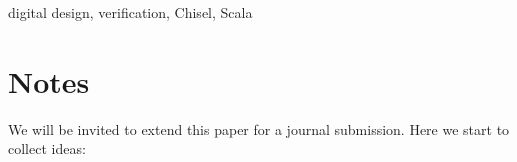 \documentclass[conference]{IEEEtran}
\begin{document}
\begin{IEEEkeywords}
digital design, verification, Chisel, Scala
\end{IEEEkeywords}

%

\section{Notes}

We will be invited to extend this paper for a journal submission. Here we start to collect ideas:
\end{document}
